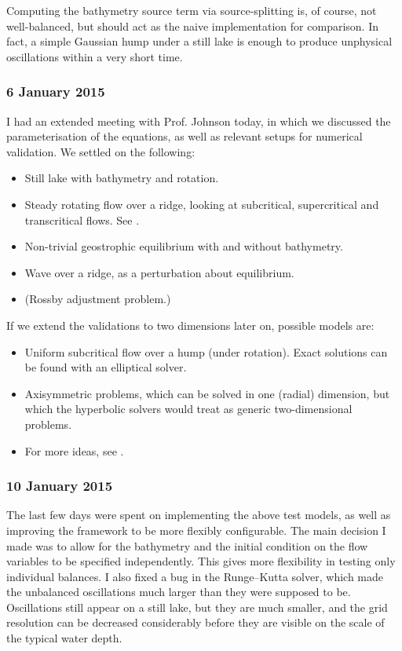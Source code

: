 \documentclass[a4paper,onecolumn,11pt]{report}
\begin{document}
Computing the bathymetry source term via source-splitting is, of course, not well-balanced, but should act as the naive implementation for comparison. In fact, a simple Gaussian hump under a still lake is enough to produce unphysical oscillations within a very short time.

\subsubsection*{6 January 2015}

I had an extended meeting with Prof. Johnson today, in which we discussed the parameterisation of the equations, as well as relevant setups for numerical validation. We settled on the following:

\begin{itemize}
  \item Still lake with bathymetry and rotation.
  \item Steady rotating flow over a ridge, looking at subcritical, supercritical and transcritical flows. See \citet{esler2005steady}.
  \item Non-trivial geostrophic equilibrium with and without bathymetry.
  \item Wave over a ridge, as a perturbation about equilibrium.
  \item (Rossby adjustment problem.)
\end{itemize}

If we extend the validations to two dimensions later on, possible models are:

\begin{itemize}
  \item Uniform subcritical flow over a hump (under rotation). Exact solutions can be found with an elliptical solver.
  \item Axisymmetric problems, which can be solved in one (radial) dimension, but which the hyperbolic solvers would treat as generic two-dimensional problems.
  \item For more ideas, see \citet{rogers2001adaptive}.
\end{itemize}

\subsubsection*{10 January 2015}

The last few days were spent on implementing the above test models, as well as improving the framework to be more flexibly configurable. The main decision I made was to allow for the bathymetry and the initial condition on the flow variables to be specified independently. This gives more flexibility in testing only individual balances. I also fixed a bug in the Runge--Kutta solver, which made the unbalanced oscillations much larger than they were supposed to be. Oscillations still appear on a still lake, but they are much smaller, and the grid resolution can be decreased considerably before they are visible on the scale of the typical water depth.
\end{document}
